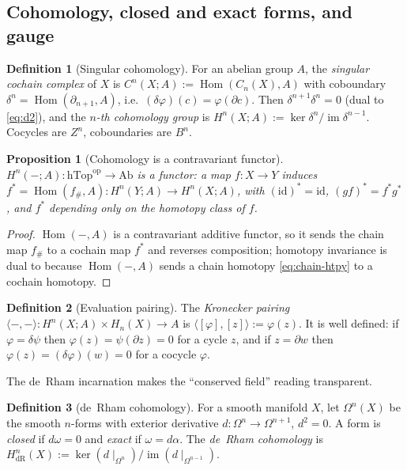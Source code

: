 \documentclass[12pt]{article}
\newtheorem{proposition}[proposition]{Proposition}
\theoremstyle{definition}
\newtheorem{definition}[definition]{Definition}
\theoremstyle{remark}
\newcommand{\hTop}{\mathrm{hTop}}
\newcommand{\Ab}{\mathrm{Ab}}
\newcommand{\id}{\mathrm{id}}
\newcommand{\im}{\operatorname{im}}
\newcommand{\Hom}{\operatorname{Hom}}
\begin{document}
\subsection{Cohomology, closed and exact forms, and gauge}

\begin{definition}[Singular cohomology]
\label{def:cohomology}
For an abelian group $A$, the \emph{singular cochain complex} of $X$ is
$C^n(X;A):=\Hom(C_n(X),A)$ with coboundary
$\delta^n=\Hom(\partial_{n+1},A)$, i.e.\ $(\delta\varphi)(c)=\varphi(\partial c)$.
Then $\delta^{n+1}\delta^n=0$ (dual to \eqref{eq:d2}), and the \emph{$n$-th
cohomology group} is $H^n(X;A):=\ker\delta^n/\im\delta^{n-1}$. Cocycles are
$Z^n$, coboundaries are $B^n$.
\end{definition}

\begin{proposition}[Cohomology is a contravariant functor]
\label{prop:coho-functor}
$H^n(-;A)\colon\hTop^{\mathrm{op}}\to\Ab$ is a functor: a map $f\colon X\to Y$
induces $f^*=\Hom(f_\#,A)\colon H^n(Y;A)\to H^n(X;A)$, with $(\id)^*=\id$,
$(gf)^*=f^*g^*$, and $f^*$ depending only on the homotopy class of $f$.
\end{proposition}

\begin{proof}
$\Hom(-,A)$ is a contravariant additive functor, so it sends the chain map $f_\#$
to a cochain map $f^*$ and reverses composition; homotopy invariance is dual to
 because $\Hom(-,A)$ sends a chain homotopy \eqref{eq:chain-htpy}
to a cochain homotopy.
\end{proof}

\begin{definition}[Evaluation pairing]
\label{def:pairing}
The \emph{Kronecker pairing} $\langle-,-\rangle\colon H^n(X;A)\times H_n(X)\to A$
is $\langle[\varphi],[z]\rangle:=\varphi(z)$. It is well defined: if
$\varphi=\delta\psi$ then $\varphi(z)=\psi(\partial z)=0$ for a cycle $z$, and if
$z=\partial w$ then $\varphi(z)=(\delta\varphi)(w)=0$ for a cocycle $\varphi$.
\end{definition}

The de~Rham incarnation makes the ``conserved field'' reading transparent.

\begin{definition}[de~Rham cohomology]
\label{def:derham}
For a smooth manifold $X$, let $\Omega^n(X)$ be the smooth $n$-forms with exterior
derivative $d\colon\Omega^n\to\Omega^{n+1}$, $d^2=0$. A form is \emph{closed} if
$d\omega=0$ and \emph{exact} if $\omega=d\alpha$. The \emph{de~Rham cohomology} is
$H^n_{\mathrm{dR}}(X):=\ker(d\!\mid_{\Omega^n})/\im(d\!\mid_{\Omega^{n-1}})$.
\end{definition}
\end{document}
